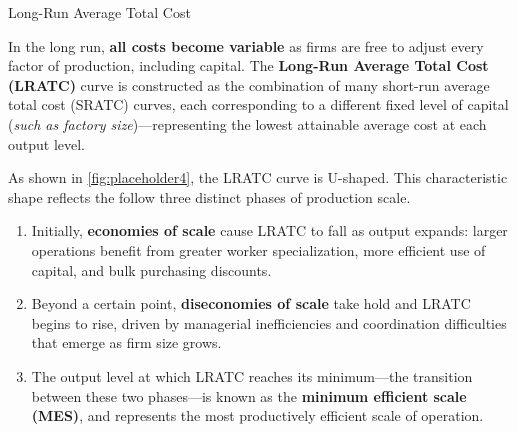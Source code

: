 \documentclass[10pt]{article}
\begin{document}
    \begin{core}{Long-Run Average Total Cost}

      In the long run, \textbf{all costs become variable} as firms are free to adjust every factor of production, including capital. The \textbf{Long-Run Average Total Cost (LRATC)} curve is constructed as the combination of many short-run average total cost (SRATC) curves, each corresponding to a different fixed level of capital (\textit{such as factory size})---representing the lowest attainable average cost at each output level.


      As shown in \autoref{fig:placeholder4}, the LRATC curve is U-shaped. This characteristic shape reflects the follow three distinct phases of production scale.


      \begin{enumerate}

        \item Initially, \textbf{economies of scale} cause LRATC to fall as output expands: larger operations benefit from greater worker specialization, more efficient use of capital, and bulk purchasing discounts. 

        \item Beyond a certain point, \textbf{diseconomies of scale} take hold and LRATC begins to rise, driven by managerial inefficiencies and coordination difficulties that emerge as firm size grows.

        \item The output level at which LRATC reaches its minimum---the transition between these two phases---is known as the \textbf{minimum efficient scale (MES)}, and represents the most productively efficient scale of operation.

      \end{enumerate}

    \end{core}
\end{document}
